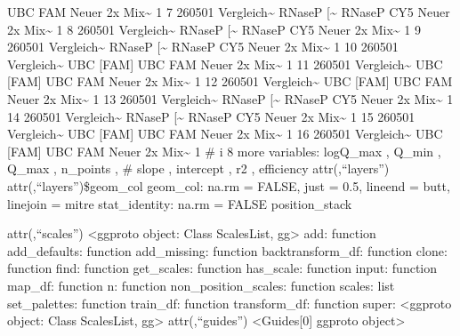 \documentclass[
]{article}
\begin{document}
UBC FAM Neuer 2x Mix\textasciitilde{} 1 7 260501
Vergleich\textasciitilde{} RNaseP {[}\textasciitilde{} RNaseP CY5 Neuer
2x Mix\textasciitilde{} 1 8 260501 Vergleich\textasciitilde{} RNaseP
{[}\textasciitilde{} RNaseP CY5 Neuer 2x Mix\textasciitilde{} 1 9 260501
Vergleich\textasciitilde{} RNaseP {[}\textasciitilde{} RNaseP CY5 Neuer
2x Mix\textasciitilde{} 1 10 260501 Vergleich\textasciitilde{} UBC
{[}FAM{]} UBC FAM Neuer 2x Mix\textasciitilde{} 1 11 260501
Vergleich\textasciitilde{} UBC {[}FAM{]} UBC FAM Neuer 2x
Mix\textasciitilde{} 1 12 260501 Vergleich\textasciitilde{} UBC
{[}FAM{]} UBC FAM Neuer 2x Mix\textasciitilde{} 1 13 260501
Vergleich\textasciitilde{} RNaseP {[}\textasciitilde{} RNaseP CY5 Neuer
2x Mix\textasciitilde{} 1 14 260501 Vergleich\textasciitilde{} RNaseP
{[}\textasciitilde{} RNaseP CY5 Neuer 2x Mix\textasciitilde{} 1 15
260501 Vergleich\textasciitilde{} UBC {[}FAM{]} UBC FAM Neuer 2x
Mix\textasciitilde{} 1 16 260501 Vergleich\textasciitilde{} UBC
{[}FAM{]} UBC FAM Neuer 2x Mix\textasciitilde{} 1 \# i 8 more variables:
logQ\_max , Q\_min , Q\_max , n\_points , \# slope , intercept , r2 ,
efficiency attr(,``layers'') attr(,``layers'')\$geom\_col geom\_col:
na.rm = FALSE, just = 0.5, lineend = butt, linejoin = mitre
stat\_identity: na.rm = FALSE position\_stack

attr(,``scales'') \textless ggproto object: Class ScalesList,
gg\textgreater{} add: function add\_defaults: function add\_missing:
function backtransform\_df: function clone: function find: function
get\_scales: function has\_scale: function input: function map\_df:
function n: function non\_position\_scales: function scales: list
set\_palettes: function train\_df: function transform\_df: function
super: \textless ggproto object: Class ScalesList, gg\textgreater{}
attr(,``guides'') \textless Guides{[}0{]} ggproto object\textgreater{}
\end{document}
